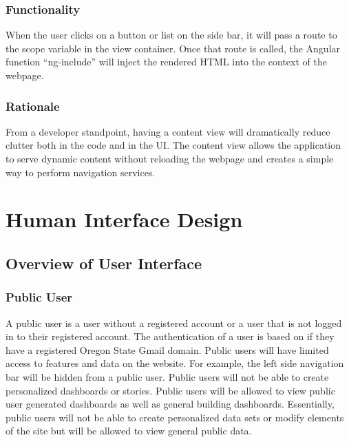 \documentclass[journal,10pt,onecolumn,compsoc]{IEEEtran}
\begin{document}
			\subsubsection{Functionality}
				When the user clicks on a button or list on the side bar, it will pass a route to the scope variable in the view container. Once that route is called, the Angular function ``ng-include'' will inject the rendered HTML into the context of the webpage.
			\subsubsection{Rationale} 
				From a developer standpoint, having a content view will dramatically reduce clutter both in the code and in the UI. The content view allows the application to serve dynamic content without reloading the webpage and creates a simple way to perform navigation services.

	
	
	\section{Human Interface Design}
    \subsection{Overview of User Interface}
    \iffalse
    Describe the functionality of the system from the user’s perspective. Explain how the
    user will be able to use your system to complete all the expected features and the
    feedback information that will be displayed for the user.
    \fi
	\subsubsection{Public User}
	A public user is a user without a registered account or a user that is not logged in to their registered account. The authentication of a user is based on if 
	they have a registered Oregon State Gmail domain. Public users will have limited access to features and data on the website. For example, the left side navigation
	bar will be hidden from a public user. Public users will not be able to create personalized dashboards or stories. Public users will be allowed to view public 
	user generated dashboards as well as general building dashboards. Essentially, public users will not be able to create personalized data sets or modify elements of the site but will be 
	allowed to view general public data. 
\end{document}
